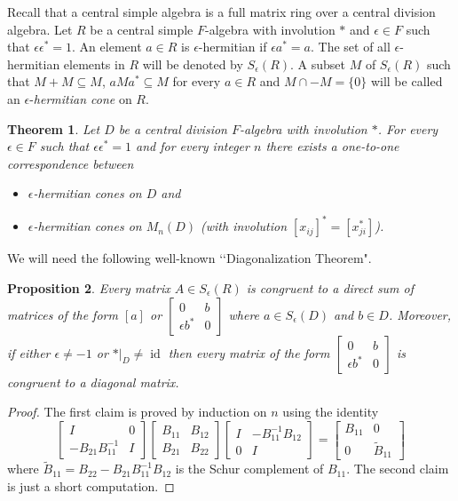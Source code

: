 \documentclass[12pt,reqno]{amsart}
\newtheorem{thm}{Theorem}
\newtheorem{prop}[thm]{Proposition}
\theoremstyle{definition}
\providecommand{\eps}{\epsilon}
\DeclareMathOperator{\id}{id}
\begin{document}
Recall that a central simple algebra is a full matrix ring over a central division algebra.
Let $R$ be a central simple $F$-algebra with involution $\ast$ and $\eps \in F$ 
such that $\eps \eps^\ast=1$.  An element $a \in R$ is $\eps$-hermitian if $\eps a^\ast=a$. 
The set of all $\eps$-hermitian elements in $R$ will be denoted by $S_\eps(R)$. 
A subset $M$ of $S_\eps(R)$ such that $M+M \subseteq M$, $aMa^\ast \subseteq M$ for every $a \in R$
and $M \cap -M = \{0\}$ will be called an $\eps$-\textit{hermitian cone} on $R$. 


\begin{thm}
\label{main}
Let $D$ be a central division $F$-algebra with involution $\ast$. For every $\eps \in F$ such that
$\eps \eps^\ast=1$ and for every integer $n$ there exists a one-to-one correspondence between
\begin{itemize}
\item $\eps$-hermitian cones on $D$ and 
\item $\eps$-hermitian cones on $M_n(D)$ (with involution $[x_{ij}]^\ast=[x_{ji}^\ast]$).
\end{itemize}
\end{thm}

We will need the following well-known \lq\lq Diagonalization Theorem".

\begin{prop}
\label{diag}
Every matrix $A \in S_\eps(R)$ is congruent to a direct sum of  matrices
of the form $[a]$ or $\left[ \begin{array}{cc}0 & b \\ \eps b^\ast & 0 \end{array} \right]$ 
where $a \in S_\eps(D)$ and $b \in D$. Moreover, if either $\eps \ne -1$ or $\ast |_D \ne \id$
then every matrix of the form
 $\left[ \begin{array}{cc}0 & b \\ \eps b^\ast & 0 \end{array} \right]$ 
is congruent to a diagonal matrix.
\end{prop}

\begin{proof} The first claim is proved by induction on $n$ using the identity
\[
\left[ \begin{array}{cc} I & 0 \\ -B_{21}B_{11}^{-1} & I \end{array} \right]
\left[ \begin{array}{cc} B_{11} & B_{12} \\ B_{21} & B_{22} \end{array} \right]
\left[ \begin{array}{cc} I & -B_{11}^{-1} B_{12} \\ 0 & I \end{array} \right] =
\left[ \begin{array}{cc} B_{11} & 0 \\ 0 & \tilde{B}_{11} \end{array} \right]
\]
where $\tilde{B}_{11} = B_{22}-B_{21}B_{11}^{-1}B_{12}$ is 
the Schur complement of $B_{11}$. The second claim is just a short computation.
\end{proof}
\end{document}
